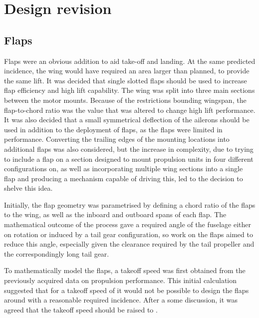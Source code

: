 \documentclass[../../main.tex]{subfiles}
\begin{document}
\section{Design revision} \label{sec:design-process:design-revision}

\subsection{Flaps} \label{sec:design-process:design-revision:flaps}


Flaps were an obvious addition to aid take-off and landing. 
At the same predicted incidence, the wing would have required an area  larger than planned, to provide the same lift.
It was decided that single slotted flaps should be used to increase flap efficiency and high lift capability.
The wing was split into three main sections between the motor mounts.
Because of the restrictions bounding wingspan, the flap-to-chord ratio was the value that was altered to change high lift performance.
It was also decided that a small symmetrical deflection of the ailerons should be used in addition to the deployment of flaps, as the flaps were limited in performance.
Converting the trailing edges of the mounting locations into additional flaps was also considered, but the increase in complexity, due to trying to include a flap on a section designed to mount propulsion units in four different configurations on, as well as incorporating multiple wing sections into a single flap and producing a mechanism capable of driving this, led to the decision to shelve this idea.

Initially, the flap geometry was parametrised by defining a chord ratio of the flaps to the wing, as well as the inboard and outboard spans of each flap.
The mathematical outcome of the process gave a required angle of the fuselage either on rotation or induced by a tail gear configuration, so work on the flaps aimed to reduce this angle, especially given the clearance required by the tail propeller and the correspondingly long tail gear. 

To mathematically model the flaps, a takeoff speed was first obtained from the previously acquired data on propulsion performance.
This initial calculation suggested that for a takeoff speed of  it would not be possible to design the flaps around with a reasonable required incidence.
After a some discussion, it was agreed that the takeoff speed should be raised to . 
\end{document}
